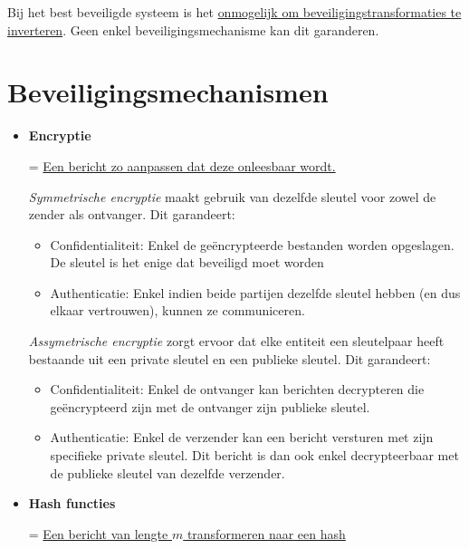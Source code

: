 \documentclass{report}
\begin{document}
	Bij het best beveiligde systeem is het \underline{onmogelijk om beveiligingstransformaties te inverteren}. Geen enkel beveiligingsmechanisme kan dit garanderen. 

	\section{Beveiligingsmechanismen}
	\begin{itemize}
		\item \textbf{Encryptie}
		
		= \underline{Een bericht zo aanpassen dat deze onleesbaar wordt.}

		\emph{Symmetrische encryptie} maakt gebruik van dezelfde sleutel voor zowel de zender als ontvanger. Dit garandeert: 
			\begin{itemize}
				\item Confidentialiteit: Enkel de geëncrypteerde bestanden worden opgeslagen. De sleutel is het enige dat beveiligd moet worden
				\item Authenticatie: Enkel indien beide partijen dezelfde sleutel hebben (en dus elkaar vertrouwen), kunnen ze communiceren.
			\end{itemize}

		\emph{Assymetrische encryptie} zorgt ervoor dat elke entiteit een sleutelpaar heeft bestaande uit een private sleutel en een publieke sleutel. Dit garandeert:
			\begin{itemize}
				\item Confidentialiteit: Enkel de ontvanger kan berichten decrypteren die geëncrypteerd zijn met de ontvanger zijn publieke sleutel. 
				\item Authenticatie: Enkel de verzender kan een bericht versturen met zijn specifieke private sleutel. Dit bericht is dan ook enkel decrypteerbaar met de publieke sleutel van dezelfde verzender.
			\end{itemize}
		
		\item \textbf{Hash functies}
		
		= \underline{Een bericht van lengte $m$ transformeren naar een hash}


\end{itemize}
\end{document}
